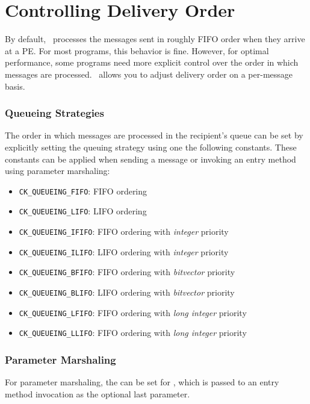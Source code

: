\section{Controlling Delivery Order}

By default, \charmpp\ processes the messages sent in roughly FIFO order when they arrive at a PE.  For most programs, this
behavior is fine. However, for optimal performance, some programs need more
explicit control over the order in which messages are processed. \charmpp\
allows you to adjust delivery order on a per-message basis.

\subsubsection{Queueing Strategies}
\label{queueing strategies}

The order in which messages are processed in the recipient's queue can be set
by explicitly setting the queuing strategy using one the following
constants. These constants can be applied when sending a message or invoking an
entry method using parameter marshaling:

\begin{itemize}
\item \texttt{CK\_QUEUEING\_FIFO}: FIFO ordering
\item \texttt{CK\_QUEUEING\_LIFO}: LIFO ordering
\item \texttt{CK\_QUEUEING\_IFIFO}: FIFO ordering with \emph{integer} priority
\item \texttt{CK\_QUEUEING\_ILIFO}: LIFO ordering with \emph{integer} priority
\item \texttt{CK\_QUEUEING\_BFIFO}: FIFO ordering with \emph{bitvector} priority
\item \texttt{CK\_QUEUEING\_BLIFO}: LIFO ordering with \emph{bitvector} priority
\item \texttt{CK\_QUEUEING\_LFIFO}: FIFO ordering with \emph{long integer} priority
\item \texttt{CK\_QUEUEING\_LLIFO}: FIFO ordering with \emph{long integer} priority
\end{itemize}

\subsubsection{Parameter Marshaling}

For parameter marshaling, the  can be set for
, which is passed to an entry method invocation as the
optional last parameter.

